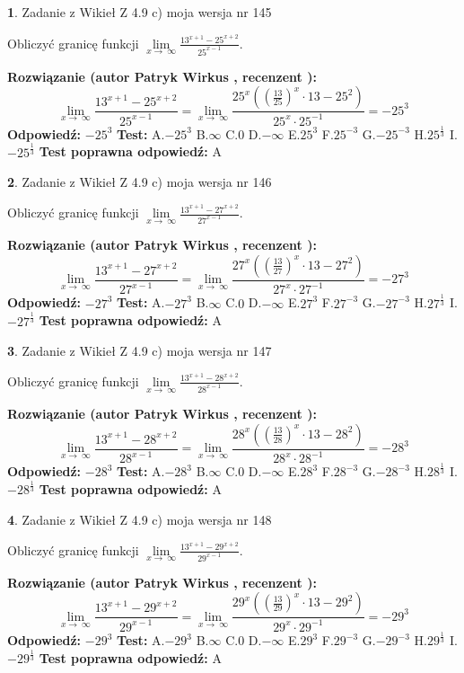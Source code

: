 \documentclass[12pt, a4paper]{article}
\theoremstyle{definition} %
\newtheorem{zad}{}
\newcommand{\zadStart}[1]{\begin{zad}#1\newline}
\newcommand{\zadStop}{\end{zad}}
\newcommand{\rozwStart}[2]{\noindent \textbf{Rozwiązanie (autor #1 , recenzent #2): }\newline}
\newcommand{\rozwStop}{\newline}
\newcommand{\odpStart}{\noindent \textbf{Odpowiedź:}\newline}
\newcommand{\odpStop}{\newline}
\newcommand{\testStart}{\noindent \textbf{Test:}\newline}
\newcommand{\testStop}{\newline}
\newcommand{\kluczStart}{\noindent \textbf{Test poprawna odpowiedź:}\newline}
\newcommand{\kluczStop}{\newline}
\begin{document}
\zadStart{Zadanie z Wikieł Z 4.9 c) moja wersja nr 145}


Obliczyć granicę funkcji  $\lim\limits_{x\to\ \infty}\frac{13^{x+1}-25^{x+2}}{25^{x-1}}$.
\zadStop
\rozwStart{Patryk Wirkus}{}
$$\lim\limits_{x\to\ \infty}\frac{13^{x+1}-25^{x+2}}{25^{x-1}}=\lim\limits_{x\to\ \infty}\frac{25^{x}((\frac{13}{25})^{x}\cdot 13 -25^{2})}{25^{x}\cdot 25^{-1}} = -25^{3}$$
\rozwStop
\odpStart
$-25^{3}$
\odpStop
\testStart
A.$-25^{3}$ B.$\infty$ C.$0$ D.$-\infty$ E.$25^{3}$
F.$25^{-3}$ G.$-25^{-3}$
H.$25^{\frac{1}{3}}$
I.$-25^{\frac{1}{3}}$
\testStop
\kluczStart
A
\kluczStop



\zadStart{Zadanie z Wikieł Z 4.9 c) moja wersja nr 146}


Obliczyć granicę funkcji  $\lim\limits_{x\to\ \infty}\frac{13^{x+1}-27^{x+2}}{27^{x-1}}$.
\zadStop
\rozwStart{Patryk Wirkus}{}
$$\lim\limits_{x\to\ \infty}\frac{13^{x+1}-27^{x+2}}{27^{x-1}}=\lim\limits_{x\to\ \infty}\frac{27^{x}((\frac{13}{27})^{x}\cdot 13 -27^{2})}{27^{x}\cdot 27^{-1}} = -27^{3}$$
\rozwStop
\odpStart
$-27^{3}$
\odpStop
\testStart
A.$-27^{3}$ B.$\infty$ C.$0$ D.$-\infty$ E.$27^{3}$
F.$27^{-3}$ G.$-27^{-3}$
H.$27^{\frac{1}{3}}$
I.$-27^{\frac{1}{3}}$
\testStop
\kluczStart
A
\kluczStop



\zadStart{Zadanie z Wikieł Z 4.9 c) moja wersja nr 147}


Obliczyć granicę funkcji  $\lim\limits_{x\to\ \infty}\frac{13^{x+1}-28^{x+2}}{28^{x-1}}$.
\zadStop
\rozwStart{Patryk Wirkus}{}
$$\lim\limits_{x\to\ \infty}\frac{13^{x+1}-28^{x+2}}{28^{x-1}}=\lim\limits_{x\to\ \infty}\frac{28^{x}((\frac{13}{28})^{x}\cdot 13 -28^{2})}{28^{x}\cdot 28^{-1}} = -28^{3}$$
\rozwStop
\odpStart
$-28^{3}$
\odpStop
\testStart
A.$-28^{3}$ B.$\infty$ C.$0$ D.$-\infty$ E.$28^{3}$
F.$28^{-3}$ G.$-28^{-3}$
H.$28^{\frac{1}{3}}$
I.$-28^{\frac{1}{3}}$
\testStop
\kluczStart
A
\kluczStop



\zadStart{Zadanie z Wikieł Z 4.9 c) moja wersja nr 148}


Obliczyć granicę funkcji  $\lim\limits_{x\to\ \infty}\frac{13^{x+1}-29^{x+2}}{29^{x-1}}$.
\zadStop
\rozwStart{Patryk Wirkus}{}
$$\lim\limits_{x\to\ \infty}\frac{13^{x+1}-29^{x+2}}{29^{x-1}}=\lim\limits_{x\to\ \infty}\frac{29^{x}((\frac{13}{29})^{x}\cdot 13 -29^{2})}{29^{x}\cdot 29^{-1}} = -29^{3}$$
\rozwStop
\odpStart
$-29^{3}$
\odpStop
\testStart
A.$-29^{3}$ B.$\infty$ C.$0$ D.$-\infty$ E.$29^{3}$
F.$29^{-3}$ G.$-29^{-3}$
H.$29^{\frac{1}{3}}$
I.$-29^{\frac{1}{3}}$
\testStop
\kluczStart
A
\kluczStop
\end{document}

